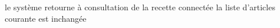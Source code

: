 \exception 
\startalternatif[ZOOM] 
  \etape le système retourne à consultation de la recette connectée
\stopcondition
\postcondition la liste d'articles courante est inchangée
\stopalternatif
\stopCU
